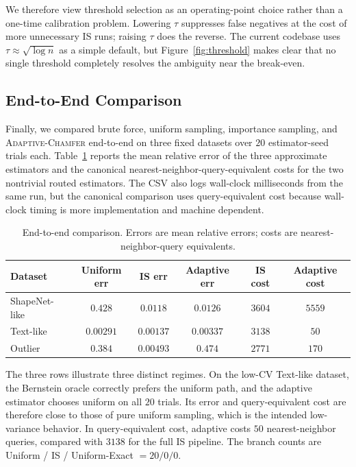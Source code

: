 \documentclass[conference]{IEEEtran}
\begin{document}
We therefore view threshold selection as an operating-point choice
rather than a one-time calibration problem. Lowering $\tau$ suppresses
false negatives at the cost of more unnecessary IS runs; raising $\tau$
does the reverse. The current codebase uses $\tau \approx \sqrt{\log n}$
as a simple default, but Figure~\ref{fig:threshold} makes clear that no
single threshold completely resolves the ambiguity near the break-even.

\subsection{End-to-End Comparison}

Finally, we compared brute force, uniform sampling, importance
sampling, and \textsc{Adaptive-Chamfer} end-to-end on three fixed
datasets over $20$ estimator-seed trials each. Table~\ref{tab:e2e}
reports the mean relative error of the three approximate estimators and
the canonical nearest-neighbor-query-equivalent costs for the two
nontrivial routed estimators. The CSV also logs wall-clock milliseconds
from the same run, but the canonical comparison uses query-equivalent
cost because wall-clock timing is more implementation and machine
dependent.


\begin{table}[t]
\centering
\caption{End-to-end comparison. Errors are mean relative errors; costs
are nearest-neighbor-query equivalents.}
\label{tab:e2e}
\scriptsize
\setlength{\tabcolsep}{2pt}
\begin{tabular}{lccccc}
\hline
Dataset & Uniform err & IS err & Adaptive err & IS cost & Adaptive cost \\
\hline
ShapeNet-like & $0.428$ & $\mathbf{0.0118}$ & $0.0126$ & $3604$ & $5559$ \\
Text-like & $0.00291$ & $\mathbf{0.00137}$ & $0.00337$ & $3138$ & $50$ \\
Outlier & $0.384$ & $\mathbf{0.00493}$ & $0.474$ & $2771$ & $170$ \\
\hline
\end{tabular}
\end{table}

The three rows illustrate three distinct regimes. On the low-CV
Text-like dataset, the Bernstein oracle correctly prefers the uniform
path, and the adaptive estimator chooses uniform on all $20$ trials. Its
error and query-equivalent cost are therefore close to those of pure uniform sampling,
which is the intended low-variance behavior. In query-equivalent cost,
adaptive costs $50$ nearest-neighbor queries, compared with $3138$ for
the full IS pipeline. The branch counts are Uniform / IS /
Uniform-Exact $= 20 / 0 / 0$.
\end{document}
